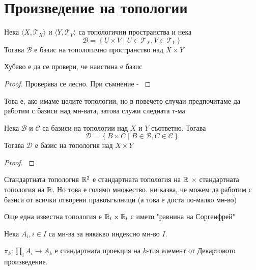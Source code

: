 \section{Произведение на топологии}
\begin{definition}
    Нека $\langle X, \mathcal T_X \rangle$ и $\langle Y,\mathcal T_Y \rangle$ са топологични пространства и нека
    \begin{equation*}
        \mathcal B = \left\{U \times V \mid U \in \mathcal T_X, V \in \mathcal T_Y\right\}
    \end{equation*}
    Тогава $\mathcal B$ е базис на топологично пространство над $X \times Y$
\end{definition}
Хубаво е да се провери, че наистина е базис
\begin{proof}
    Проверява се лесно. При съмнение - \cite[p.~86]{munkrestopology}
\end{proof}
Това е, ако имаме целите топологии, но в повечето случаи предпочитаме да работим с базиси над мн-вата, затова служи следната т-ма
\begin{theorem}\label{thm:basis-of-times}
    Нека $\mathcal B$ и $\mathcal C$ са базиси на топологии над $X$ и $Y$ съответно. Тогава
    \begin{equation*}
        \mathcal D = \left\{ B \times C \mid B \in \mathcal B, C \in \mathcal C \right\}
    \end{equation*}
    Тогава $\mathcal D$ е базис на топология над $X \times Y$
\end{theorem}
\begin{proof}
    \cite[p.~87]{munkrestopology}
\end{proof}
\begin{example}
    Стандартната топология ${\mathbb{R}}^2$ е стандартната топология на ${\mathbb{R}}$ $\times$ стандартната топология на ${\mathbb{R}}$. Но това е голямо множество.  ни казва, че можем да работим с базиса от всички отворени правоъгълници (а това е доста по-малко мн-во)
\end{example}
\begin{example}
    Още една известна топология е ${\mathbb{R}}_l \times {\mathbb{R}}_l$ с името "равнина на Соргенфрей"
\end{example}
\begin{notation} 
    Нека $A_i, i \in I$ са мн-ва за някакво индексно мн-во $I$.
    
    $\pi_k : \prod\limits_i A_i \to A_k$ е стандартната проекция на $k$-тия елемент от Декартовото произведение.
\end{notation}
